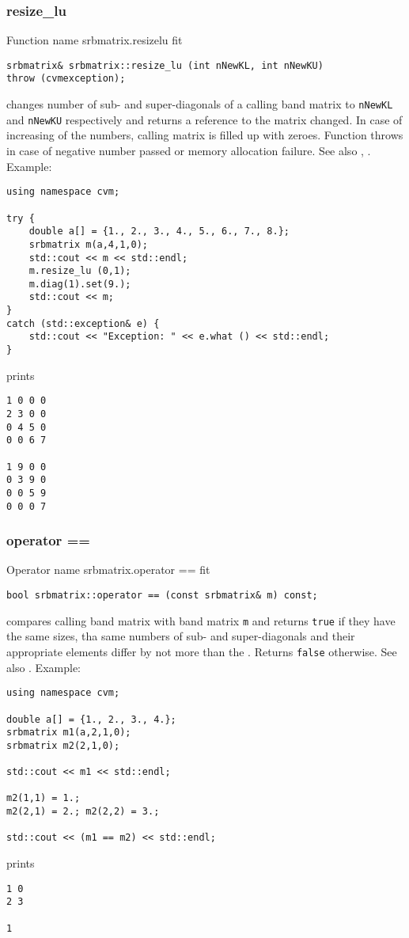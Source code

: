 \subsubsection{resize\_lu}
Function%
\pdfdest name {srbmatrix.resizelu} fit
\begin{verbatim}
srbmatrix& srbmatrix::resize_lu (int nNewKL, int nNewKU) 
throw (cvmexception);
\end{verbatim}
changes  number of sub- and super-diagonals 
of a calling band matrix to \verb"nNewKL" and \verb"nNewKU" respectively
and returns a reference to
the matrix changed. In case of increasing of the numbers, calling matrix
is filled up with zeroes. 
Function throws  
in case of negative number passed or memory allocation failure.
See also ,
.
Example:
\begin{Verbatim}
using namespace cvm;

try {
    double a[] = {1., 2., 3., 4., 5., 6., 7., 8.};
    srbmatrix m(a,4,1,0);
    std::cout << m << std::endl;
    m.resize_lu (0,1);
    m.diag(1).set(9.);
    std::cout << m;
}
catch (std::exception& e) {
    std::cout << "Exception: " << e.what () << std::endl;
}
\end{Verbatim}
prints
\begin{Verbatim}
1 0 0 0
2 3 0 0
0 4 5 0
0 0 6 7

1 9 0 0
0 3 9 0
0 0 5 9
0 0 0 7
\end{Verbatim}
\newpage




\subsubsection{operator ==}
Operator%
\pdfdest name {srbmatrix.operator ==} fit
\begin{verbatim}
bool srbmatrix::operator == (const srbmatrix& m) const;
\end{verbatim}
compares  calling band matrix with  band matrix \verb"m"
and returns \verb"true" if they have the same sizes, tha same
numbers of sub- and super-diagonals 
and their appropriate elements differ by not more than the
.
Returns \verb"false" otherwise.
See also .
Example:
\begin{Verbatim}
using namespace cvm;

double a[] = {1., 2., 3., 4.};
srbmatrix m1(a,2,1,0);
srbmatrix m2(2,1,0);

std::cout << m1 << std::endl;

m2(1,1) = 1.; 
m2(2,1) = 2.; m2(2,2) = 3.;

std::cout << (m1 == m2) << std::endl;
\end{Verbatim}
prints
\begin{Verbatim}
1 0
2 3

1
\end{Verbatim}
\newpage




